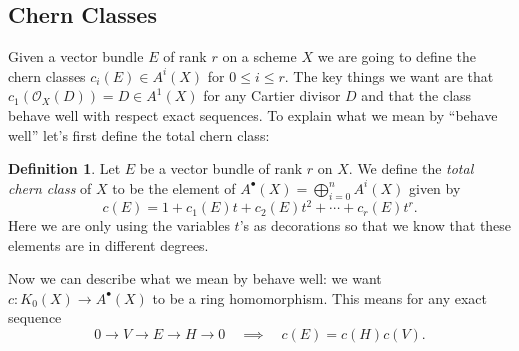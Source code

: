 \documentclass[12pt]{article}
\numberwithin{equation}{section}
\theoremstyle{definition}
\newtheorem{definition}[theorem]{Definition}
\newtheorem{exercise}[theorem]{Exercise}
\theoremstyle{remark}
\newtheorem{remark}[theorem]{Remark}
\newcommand{\Ocal}{\mathcal{O}}
\newcommand{\Coh}{\operatorname{Coh}}
\newcommand{\NN}{\mathbb{N}}
\begin{document}

\subsection{Chern Classes}
Given a vector bundle $E$ of rank $r$ on a scheme $X$ we are going to define the chern classes $c_i(E)\in A^i(X)$ for $0\leq i \leq r$.
The key things we want are that $c_1(\Ocal_X(D)) = D \in A^1(X)$ for any Cartier divisor $D$ and that the class behave well with respect exact sequences. 
To explain what we mean by ``behave well'' let's first define the total chern class:
\begin{definition}
	Let $E$ be a vector bundle of rank $r$ on $X$.
	We define the \emph{total chern class} of $X$ to be the element of $A^{\bullet}(X) = \bigoplus_{i=0}^n A^i(X)$ given by 
	$$ c(E) = 1 + c_1(E)t + c_2(E)t^2 + \cdots + c_r(E)t^r. $$
	Here we are only using the variables $t$'s as decorations so that we know that these elements are in different degrees. 
\end{definition}
Now we can describe what we mean by behave well: we want $c:K_0(X)\to A^{\bullet}(X)$ to be a ring homomorphism. 
This means for any exact sequence 
$$ 0 \to V \to E \to H \to 0 \quad \implies \quad c(E) = c(H)c(V). $$

\end{document}
